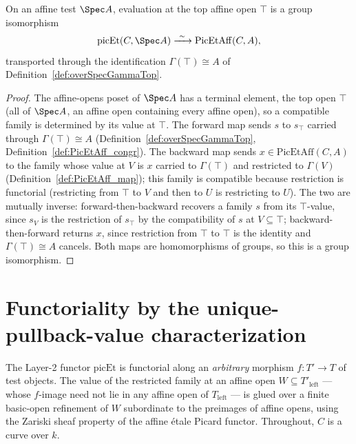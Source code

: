 \begin{definition}
  \label{def:picEtAffineEquiv}
  \leanok
  On an affine test \(\Spec A\), evaluation at the top affine open \(\top\) is a group isomorphism
  \[
    \mathrm{picEt}(C, \Spec A) \xrightarrow{\ \sim\ } \mathrm{PicEtAff}(C, A),
  \]
  transported through the identification \(\Gamma(\top) \cong A\) of
  Definition~\ref{def:overSpecGammaTop}.
\end{definition}
\begin{proof}
  \leanok
  The affine-opens poset of \(\Spec A\) has a terminal element, the top open \(\top\) (all of
  \(\Spec A\), an affine open containing every affine open), so a compatible family is determined by
  its value at \(\top\). The forward map sends \(s\) to \(s_\top\) carried through \(\Gamma(\top)
  \cong A\) (Definition~\ref{def:overSpecGammaTop}, Definition~\ref{def:PicEtAff_congr}). The
  backward map sends \(x \in \mathrm{PicEtAff}(C, A)\) to the family whose value at \(V\) is \(x\)
  carried to \(\Gamma(\top)\) and restricted to \(\Gamma(V)\) (Definition~\ref{def:PicEtAff_map});
  this family is compatible because restriction is functorial (restricting from \(\top\) to \(V\)
  and then to \(U\) is restricting to \(U\)). The two are mutually inverse: forward-then-backward
  recovers a family \(s\) from its \(\top\)-value, since \(s_V\) is the restriction of \(s_\top\) by
  the compatibility of \(s\) at \(V \subseteq \top\); backward-then-forward returns \(x\), since
  restriction from \(\top\) to \(\top\) is the identity and \(\Gamma(\top) \cong A\) cancels. Both
  maps are homomorphisms of groups, so this is a group isomorphism.
\end{proof}

\section{Functoriality by the unique-pullback-value characterization}

The Layer-2 functor \(\mathrm{picEt}\) is functorial along an \emph{arbitrary} morphism
\(f \colon T' \to T\) of test objects. The value of the restricted family at an affine open
\(W \subseteq T'_{\mathrm{left}}\) --- whose \(f\)-image need not lie in any affine open of
\(T_{\mathrm{left}}\) --- is glued over a finite basic-open refinement of \(W\) subordinate to the
preimages of affine opens, using the Zariski sheaf property of the affine \'etale Picard functor.
Throughout, \(C\) is a curve over \(k\).

